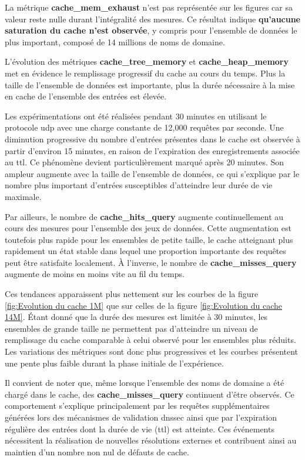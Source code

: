 \documentclass[12pt, a4paper]{report}
\begin{document}
	La métrique \textbf{cache\_mem\_exhaust} n'est pas représentée sur les figures car sa valeur reste nulle durant l'intégralité des mesures. Ce résultat indique \textbf{qu'aucune saturation du cache n'est observée}, y compris pour l'ensemble de données le plus important, composé de 14 millions de noms de domaine.

	L'évolution des métriques \textbf{cache\_tree\_memory} et \textbf{cache\_heap\_memory} met en évidence le remplissage progressif du cache au cours du temps. Plus la taille de l'ensemble de données est importante, plus la durée nécessaire à la mise en cache de l'ensemble des entrées est élevée.

	Les expérimentations ont été réalisées pendant 30 minutes en utilisant le protocole \gls{udp} avec une charge constante de 12,000 requêtes par seconde. Une diminution progressive du nombre d'entrées présentes dans le cache est observée à partir d'environ 15 minutes, en raison de l'expiration des enregistrements associée au \gls{ttl}. Ce phénomène devient particulièrement marqué après 20 minutes. Son ampleur augmente avec la taille de l'ensemble de données, ce qui s'explique par le nombre plus important d'entrées susceptibles d'atteindre leur durée de vie maximale.

	Par ailleurs, le nombre de \textbf{cache\_hits\_query} augmente continuellement au cours des mesures pour l'ensemble des jeux de données. Cette augmentation est toutefois plus rapide pour les ensembles de petite taille, le cache atteignant plus rapidement un état stable dans lequel une proportion importante des requêtes peut être satisfaite localement. À l'inverse, le nombre de \textbf{cache\_misses\_query} augmente de moins en moins vite au fil du temps.

	Ces tendances apparaissent plus nettement sur les courbes de la figure \ref{fig:Evolution du cache 1M} que sur celles de la figure \ref{fig:Evolution du cache 14M}. Étant donné que la durée des mesures est limitée à 30 minutes, les ensembles de grande taille ne permettent pas d'atteindre un niveau de remplissage du cache comparable à celui observé pour les ensembles plus réduits. Les variations des métriques sont donc plus progressives et les courbes présentent une pente plus faible durant la phase initiale de l'expérience.

	Il convient de noter que, même lorsque l'ensemble des noms de domaine a été chargé dans le cache, des \textbf{cache\_misses\_query} continuent d'être observés. Ce comportement s'explique principalement par les requêtes supplémentaires générées lors des mécanismes de validation \gls{dnssec} ainsi que par l'expiration régulière des entrées dont la durée de vie (\gls{ttl}) est atteinte. Ces événements nécessitent la réalisation de nouvelles résolutions externes et contribuent ainsi au maintien d'un nombre non nul de défauts de cache.
\end{document}
